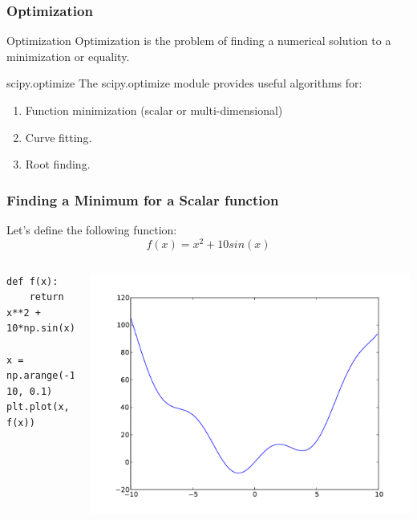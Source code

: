 \documentclass[10pt,colorlinks]{beamer}
\begin{document}
\begin{frame}[fragile]\frametitle{Optimization}
  \begin{block}{Optimization}
  Optimization is the problem of finding a numerical solution to a minimization or equality.
  \end{block}

\pause \begin{block}{scipy.optimize}
The scipy.optimize module provides useful algorithms for:
\begin{enumerate}
    \item Function minimization (scalar or multi-dimensional)
    \item Curve fitting.
    \item Root finding.
\end{enumerate} 
\end{block}
\end{frame}

\begin{frame}[fragile]\frametitle{Finding a Minimum for a Scalar function}
  Let's define the following function:
\begin{equation}
    f(x)=x^2 + 10 sin(x)
\end{equation}
\begin{columns}[c]
\small
\begin{verbatim}
def f(x):
    return x**2 + 10*np.sin(x)

x = np.arange(-10, 10, 0.1)
plt.plot(x, f(x))  
\end{verbatim}

\includegraphics[width=\textwidth]{plwfigis/CursP_3_figure38}

\end{columns}
\end{frame}
\end{document}
